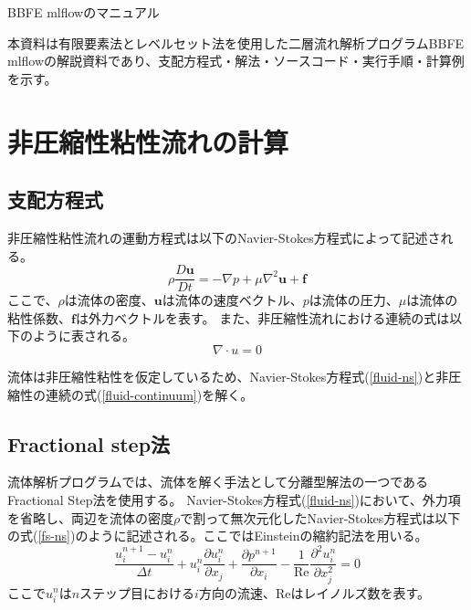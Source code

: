 \documentclass[8pt,a4paper]{article}
\newcommand{\bm}{\boldsymbol}
\begin{document}
 

\begin{center}
	{\Large BBFE mlflowのマニュアル} \\
\end{center}

\rightline{\today}

本資料は有限要素法とレベルセット法を使用した二層流れ解析プログラムBBFE mlflowの解説資料であり、支配方程式・解法・ソースコード・実行手順・計算例を示す。

\tableofcontents

\newpage
\section{非圧縮性粘性流れの計算}
\subsection{支配方程式}
非圧縮性粘性流れの運動方程式は以下のNavier-Stokes方程式によって記述される。
\begin{equation}
\label{fluid-ns}
\rho \frac{D\bm{u}}{Dt} = - \nabla p + \mu \nabla^{2} \bm{u} + \bm{f}
\end{equation}
ここで、$\rho$は流体の密度、$\bm{u}$は流体の速度ベクトル、$p$は流体の圧力、$\mu$は流体の粘性係数、$\bm{f}$は外力ベクトルを表す。
また、非圧縮性流れにおける連続の式は以下のように表される。
\begin{equation}
\label{fluid-continuum}
\nabla \cdot u = 0
\end{equation}

流体は非圧縮性粘性を仮定しているため、Navier-Stokes方程式(\ref{fluid-ns})と非圧縮性の連続の式(\ref{fluid-continuum})を解く。

\subsection{Fractional step法}
流体解析プログラムでは、流体を解く手法として分離型解法の一つであるFractional Step法を使用する。
Navier-Stokes方程式(\ref{fluid-ns})において、外力項を省略し、両辺を流体の密度$\rho$で割って無次元化したNavier-Stokes方程式は以下の式(\ref{fs-ns})のように記述される。ここではEinsteinの縮約記法を用いる。
\begin{equation}
\label{fs-ns}
	\frac{u^{n+1}_i - u^{n}_i}{\Delta t} + u^{n}_i \frac{\partial u^{n}_i}{\partial x_j}
	+ \frac{\partial p^{n+1}}{\partial x_i} - \frac{1}{\mathrm{Re}} \frac{\partial^{2} u^{n}_i}{\partial x^{2}_j} = 0
\end{equation}
ここで$u^{n}_{i}$は$n$ステップ目における$i$方向の流速、$\mathrm{Re}$はレイノルズ数を表す。
\end{document}
